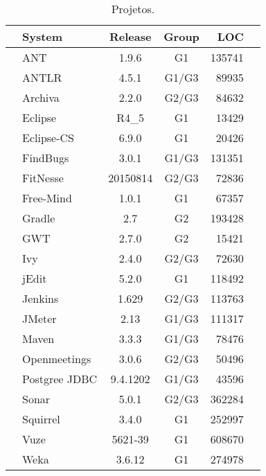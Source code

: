 
\begin{table}[h]\footnotesize
\centering
	\caption{Projetos.}
	\begin{tabular}{l|lccrr}\hline
		 & \textbf{System} & \textbf{Release} & \textbf{Group}  & \textbf{LOC} \\\hline \hline
		\multirow{22}{*}{\rotatebox[origin=c]{90}{\textbf{Application}}} 
																 & ANT & 1.9.6 & G1 & 135741\\
																 & ANTLR  & 4.5.1 & G1/G3 & 89935 \\
																 & Archiva  & 2.2.0 & G2/G3 & 84632\\
																 & Eclipse & R4\_5 & G1 & 13429\\
																 & Eclipse-CS & 6.9.0 & G1 & 20426\\
																 & FindBugs & 3.0.1 & G1/G3 & 131351\\
																 & FitNesse & 20150814 & G2/G3 & 72836\\
																 & Free-Mind & 1.0.1 & G1 & 67357\\
																 & Gradle & 2.7 & G2 & 193428\\
																 & GWT & 2.7.0 & G2 & 15421\\
																 & Ivy & 2.4.0 & G2/G3 & 72630\\
																 & jEdit & 5.2.0 & G1 & 118492\\
						   									     & Jenkins & 1.629 & G2/G3 & 113763\\
																 & JMeter & 2.13 & G1/G3 & 111317\\
																 & Maven & 3.3.3 & G1/G3 & 78476\\
																 & Openmeetings & 3.0.6 & G2/G3 & 50496\\
																 & Postgree JDBC & 9.4.1202 & G1/G3 & 43596\\ 
																 & Sonar & 5.0.1 & G2/G3 & 362284\\
																 & Squirrel & 3.4.0 & G1 & 252997\\
																 & Vuze & 5621-39 & G1 & 608670\\
																 & Weka & 3.6.12 & G1 & 274978\\
																 \hline
					

\end{tabular}
\end{table}
